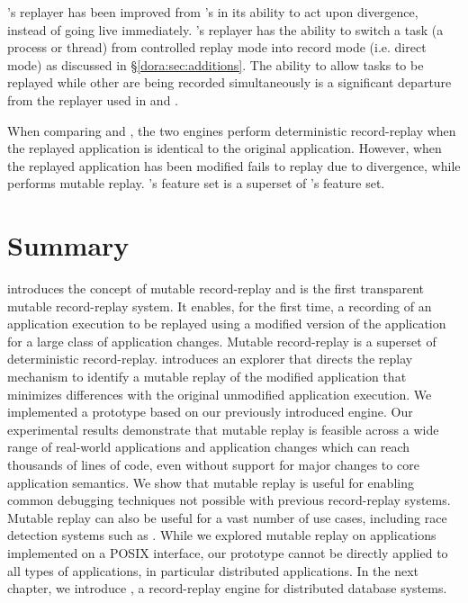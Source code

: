 \dora's replayer has been improved from \racepro's in its ability to act upon
divergence, instead of going live immediately. \dora's replayer has the ability
to switch a task (a process or thread) from controlled replay mode into record
mode (i.e. direct mode) as discussed in \S\ref{dora:sec:additions}.
The ability to allow tasks to be replayed while other are being recorded
simultaneously is a significant departure from the replayer used in \scribe and
\racepro.

When comparing \dora and \scribe, the two engines perform deterministic
record-replay when the replayed application is identical to the original
application.  However, when the replayed application has been modified
\scribe fails to replay due to divergence, while \dora performs mutable replay.
\dora's feature set is a superset of \scribe's feature set.

\section{Summary}
\label{dora:sec:conclusion}

{\dora} introduces the concept of mutable record-replay and is the first
transparent mutable record-replay system.  It enables, for the first time, a
recording of an application execution to be replayed using a modified version of
the application for a large class of application changes.
Mutable record-replay is a superset of deterministic record-replay.
{\dora} introduces an
explorer that directs the replay mechanism to identify a mutable replay of the
modified application that minimizes differences with the original unmodified
application execution.
We implemented a \dora prototype based on our previously introduced \racepro engine.
Our experimental results demonstrate that
mutable replay is feasible across a wide range of real-world applications and
application changes which can reach thousands of lines of code, even without
support for major changes to core application semantics. We show that mutable
replay is useful for enabling common debugging techniques not possible with
previous record-replay systems. Mutable replay can also be useful for a vast
number of use cases, including race detection systems such as \racepro.
While we explored mutable replay on applications implemented on a POSIX
interface, our \dora prototype cannot be directly applied to all types of
applications, in particular distributed applications. In the next chapter, we
introduce \synapse, a record-replay engine for distributed database systems.
